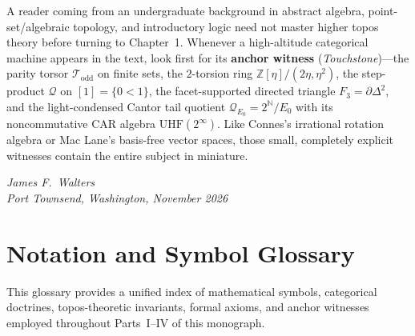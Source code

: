 \documentclass[10pt,twoside,openright]{book}
\theoremstyle{crmplain}
\theoremstyle{crmdef}
\theoremstyle{crmremark}
\begin{document}
A reader coming from an undergraduate background in abstract algebra, point-set/algebraic topology, and introductory logic need not master higher topos theory before turning to Chapter~1. Whenever a high-altitude categorical machine appears in the text, look first for its \textbf{anchor witness} (\emph{Touchstone})---the parity torsor $\mathcal{T}_{\mathrm{odd}}$ on finite sets, the $2$-torsion ring $\mathbb{Z}[\eta]/(2\eta, \eta^2)$, the step-product $\mathcal{Q}$ on $[1] = \{0 < 1\}$, the facet-supported directed triangle $F_3 = \partial\Delta^2$, and the light-condensed Cantor tail quotient $\mathcal{Q}_{E_0} = 2^{\mathbb{N}}/E_0$ with its noncommutative CAR algebra $\mathrm{UHF}(2^\infty)$. Like Connes's irrational rotation algebra or Mac Lane's basis-free vector spaces, those small, completely explicit witnesses contain the entire subject in miniature.

\bigskip
\noindent\emph{James F.\ Walters}\\
\emph{Port Townsend, Washington, November 2026}

\chapter{Notation and Symbol Glossary}
\label{ch:notation-glossary}

This glossary provides a unified index of mathematical symbols, categorical doctrines, topos-theoretic invariants, formal axioms, and anchor witnesses employed throughout Parts~I--IV of this monograph.
\end{document}
